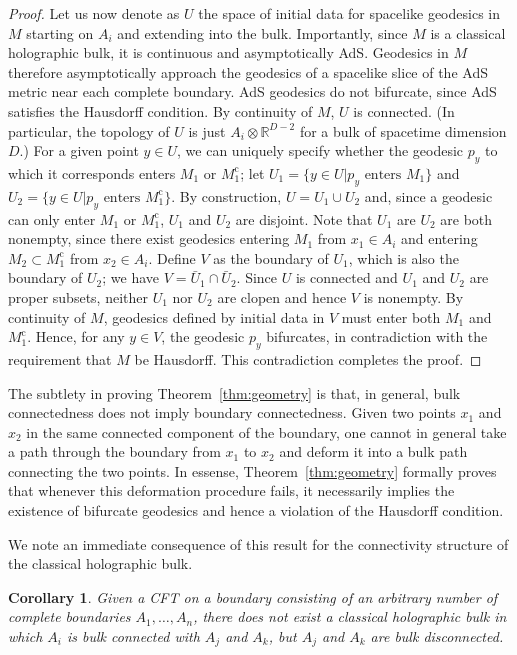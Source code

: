 \documentclass[12pt,english]{article}
\newtheorem{corollary}{Corollary}[theorem]
\begin{document}
\begin{proof}
Let us now denote as $U$ the space of initial data for spacelike geodesics in $M$ starting on $A_i$ and extending into the bulk. Importantly, since $M$ is a classical holographic bulk, it is continuous and asymptotically AdS. Geodesics in $M$ therefore asymptotically approach the geodesics of a spacelike slice of the AdS metric near each complete boundary. AdS geodesics do not bifurcate, since AdS satisfies the Hausdorff condition. By continuity of $M$, $U$ is connected. (In particular, the topology of $U$ is just $A_i \otimes \mathbb{R}^{D-2}$ for a bulk of spacetime dimension $D$.) For a given point $y\in U$, we can uniquely specify whether the geodesic $p_y$ to which it corresponds enters $M_1$ or $M_1^\mathrm{c}$; let $U_1 = \{y\in U | p_y \text{ enters } M_1\}$ and $U_2 = \{y\in U | p_y \text{ enters } M_1^\mathrm{c}\}$. By construction, $U=U_1 \cup U_2$ and, since a geodesic can only enter $M_1$ or $M_1^\mathrm{c}$, $U_1$ and $U_2$ are disjoint. Note that $U_1$ are $U_2$ are both nonempty, since there exist geodesics entering $M_1$ from $x_1\in A_i$ and entering $M_2\subset M_1^\mathrm{c}$ from $x_2 \in A_i$. Define $V$ as the boundary of $U_1$, which is also the boundary of $U_2$; we have $V=\bar{U}_1 \cap \bar{U}_2$. Since $U$ is connected and $U_1$ and $U_2$ are proper subsets, neither $U_1$ nor $U_2$ are clopen and hence $V$ is nonempty. By continuity of $M$, geodesics defined by initial data in $V$ must enter both $M_1$ and $M_1^\mathrm{c}$. Hence, for any $y\in V$, the geodesic $p_y$ bifurcates, in contradiction with the requirement that $M$ be Hausdorff. This contradiction completes the proof.
\end{proof}

The subtlety in proving Theorem~\ref{thm:geometry} is that, in general, bulk connectedness does not imply boundary connectedness. Given two points $x_1$ and $x_2$ in the same connected component of the boundary, one cannot in general take a path through the boundary from $x_1$ to $x_2$ and deform it into a bulk path connecting the two points. In essense, Theorem~\ref{thm:geometry} formally proves that whenever this deformation procedure fails, it necessarily implies the existence of bifurcate geodesics and hence a violation of the Hausdorff condition.

We note an immediate consequence of this result for the connectivity structure of the classical holographic bulk.

\begin{corollary}\label{cor:connected} Given a CFT on a boundary consisting of an arbitrary number of complete boundaries $A_1,\ldots,A_n$, there does not exist a classical holographic bulk in which $A_i$ is bulk connected with $A_j$ and $A_k$, but $A_j$ and $A_k$ are bulk disconnected.
\end{corollary}
\end{document}
